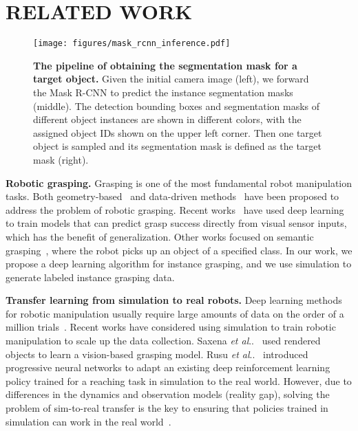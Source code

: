 \documentclass[letterpaper, 10 pt, conference]{ieeeconf}  %
\makeatletter
\newcommand{\etal}{~et al.~}
\DeclareRobustCommand\onedot{\futurelet\@let@token\@onedot}
\def\@onedot{\ifx\@let@token.\else.\null\fi\xspace}
\def\etal{\emph{et al}\onedot}
\makeatother
\begin{document}
\section{RELATED WORK}\begin{figure*}[ht]
\centering
\texttt{[image: figures/mask\_rcnn\_inference.pdf]}
\caption{\textbf{The pipeline of obtaining the segmentation mask for a target object.} Given the initial camera image (left), we forward the Mask R-CNN to predict the instance segmentation masks (middle). The detection bounding boxes and segmentation masks of different object instances are shown in different colors, with the assigned object IDs shown on the upper left corner. Then one target object is sampled and its segmentation mask is defined as the target mask (right).}
\label{fig:mask_rcnn_pipeline}
\vspace{-6mm}
\end{figure*}\textbf{Robotic grasping.} Grasping is one of the most fundamental robot manipulation tasks. Both geometry-based~\cite{force_closure_1995,caging_servey,bai2014dexterous} and data-driven methods~\cite{bohg2014data} have been proposed to address the problem of robotic grasping. Recent works~\cite{levine2016learning,gupta} have used deep learning to train models that can predict grasp success directly from visual sensor inputs, which has the benefit of generalization. Other works focused on semantic grasping~\cite{jang2017end}, where the robot picks up an object of a specified class. In our work, we propose a deep learning algorithm for instance grasping, and we use simulation to generate labeled instance grasping data.

\textbf{Transfer learning from simulation to real robots.} Deep learning methods for robotic manipulation usually require large amounts of data on the order of a million trials~\cite{levine2016learning}. Recent works have considered using simulation to train robotic manipulation to scale up the data collection. Saxena \etal~\cite{saxena2008robotic} used rendered objects to learn a vision-based grasping model. Rusu \etal ~\cite{rusu2016sim} introduced progressive neural networks to adapt an existing deep reinforcement learning policy trained for a reaching task in simulation to the real world. However, due to differences in the dynamics and observation models (reality gap), solving the problem of sim-to-real transfer is the key to ensuring that policies trained in simulation can work in the real world~\cite{taylor2009transfer}.
\end{document}
